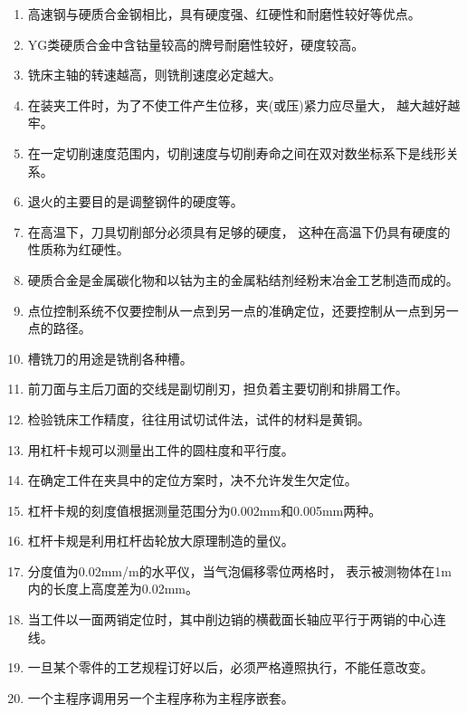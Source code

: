 \documentclass[12pt,twocolumn,landscape,UTF8,twoside]{ctexart}
\begin{document}
\begin{spacing}{1.089}
\begin{enumerate} [1、]
\item 高速钢与硬质合金钢相比，具有硬度强、红硬性和耐磨性较好等优点。 
\item YG类硬质合金中含钴量较高的牌号耐磨性较好，硬度较高。
\item 铣床主轴的转速越高，则铣削速度必定越大。
\item 在装夹工件时，为了不使工件产生位移，夹(或压)紧力应尽量大， 越大越好越牢。 
\item 在一定切削速度范围内，切削速度与切削寿命之间在双对数坐标系下是线形关系。 
\item 退火的主要目的是调整钢件的硬度等。
\item 在高温下，刀具切削部分必须具有足够的硬度， 这种在高温下仍具有硬度的性质称为红硬性。 
\item 硬质合金是金属碳化物和以钴为主的金属粘结剂经粉末冶金工艺制造而成的。  
\item 点位控制系统不仅要控制从一点到另一点的准确定位，还要控制从一点到另一点的路径。
\item 槽铣刀的用途是铣削各种槽。
\item 前刀面与主后刀面的交线是副切削刃，担负着主要切削和排屑工作。
\item 检验铣床工作精度，往往用试切试件法，试件的材料是黄铜。
\item 用杠杆卡规可以测量出工件的圆柱度和平行度。
\item 在确定工件在夹具中的定位方案时，决不允许发生欠定位。
\item 杠杆卡规的刻度值根据测量范围分为0.002mm和0.005mm两种。 
\item 杠杆卡规是利用杠杆齿轮放大原理制造的量仪。
\item 分度值为0.02mm/m的水平仪，当气泡偏移零位两格时， 表示被测物体在1m内的长度上高度差为0.02mm。
\item 当工件以一面两销定位时，其中削边销的横截面长轴应平行于两销的中心连线。
\item 一旦某个零件的工艺规程订好以后，必须严格遵照执行，不能任意改变。 
\item 一个主程序调用另一个主程序称为主程序嵌套。

	\end{enumerate} 
	\end{spacing}
\end{document}
